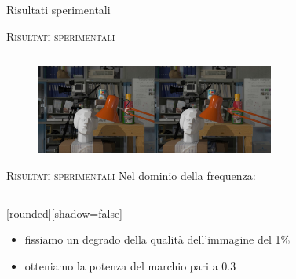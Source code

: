 \documentclass{beamer}
\begin{document}
\begin{section}{Risultati sperimentali}
\begin{frame}[t]{\textsc{Risultati sperimentali}}
\begin{columns}
\begin{column}{5cm}
\end{column}
\end{columns}
\vspace{2mm}
\begin{figure}
  \includegraphics[width=0.7\textwidth]{./img_wat/marked_1_gauss.jpg}  
  \caption{} 
  \label{fig:mg1}
\end{figure}
\end{frame}


\begin{frame}[t]{\textsc{Risultati sperimentali}}
Nel dominio della frequenza:
\begin{columns}
\begin{column}{5cm}
[rounded][shadow=false]
\begin{block}{}
\begin{itemize}
\item fissiamo un degrado della qualit\`{a} dell'immagine del 1\%
\item otteniamo la potenza del marchio pari a 0.3 
\end{itemize}
\end{block}

\end{column}
\begin{column}{5cm}
\vspace{-10mm}
\begin{table}
\end{table}


\end{column}
\end{columns}
\end{frame}
\end{section}
\end{document}

